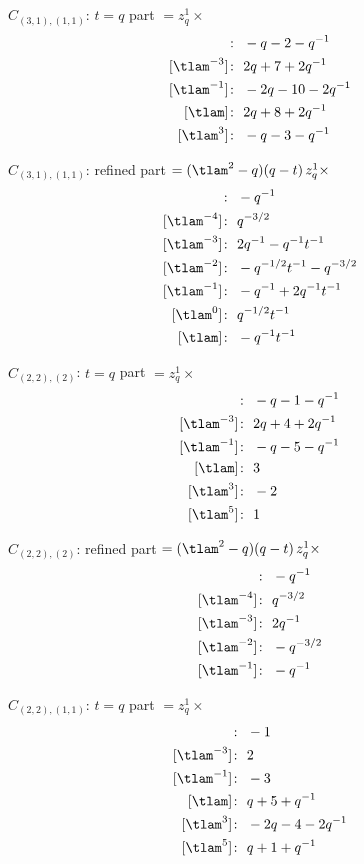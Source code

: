 $\hat C_{(3,1),(1,1)}$: $t = q$ part $= z_q^{1} \times$
\begin{align*}
[\tlam^{-5}]\colon\ & -q -2 -q^{-1} \\
[\tlam^{-3}]\colon\ & 2 q +7 +2 q^{-1} \\
[\tlam^{-1}]\colon\ & -2 q -10 -2 q^{-1} \\
[\tlam]\colon\ & 2 q +8 +2 q^{-1} \\
[\tlam^{3}]\colon\ & -q -3 -q^{-1}
\end{align*}

$\hat C_{(3,1),(1,1)}$: refined part $= (\tlam^2 - q)(q - t)\, z_q^{1} \times$
\begin{align*}
[\tlam^{-5}]\colon\ & -q^{-1} \\
[\tlam^{-4}]\colon\ & q^{-3/2} \\
[\tlam^{-3}]\colon\ & 2 q^{-1} -q^{-1} t^{-1} \\
[\tlam^{-2}]\colon\ & -q^{-1/2} t^{-1} -q^{-3/2} \\
[\tlam^{-1}]\colon\ & -q^{-1} +2 q^{-1} t^{-1} \\
[\tlam^{0}]\colon\ & q^{-1/2} t^{-1} \\
[\tlam]\colon\ & -q^{-1} t^{-1}
\end{align*}

$\hat C_{(2,2),(2)}$: $t = q$ part $= z_q^{1} \times$
\begin{align*}
[\tlam^{-5}]\colon\ & -q -1 -q^{-1} \\
[\tlam^{-3}]\colon\ & 2 q +4 +2 q^{-1} \\
[\tlam^{-1}]\colon\ & -q -5 -q^{-1} \\
[\tlam]\colon\ & 3 \\
[\tlam^{3}]\colon\ & -2 \\
[\tlam^{5}]\colon\ & 1
\end{align*}

$\hat C_{(2,2),(2)}$: refined part $= (\tlam^2 - q)(q - t)\, z_q^{1} \times$
\begin{align*}
[\tlam^{-5}]\colon\ & -q^{-1} \\
[\tlam^{-4}]\colon\ & q^{-3/2} \\
[\tlam^{-3}]\colon\ & 2 q^{-1} \\
[\tlam^{-2}]\colon\ & -q^{-3/2} \\
[\tlam^{-1}]\colon\ & -q^{-1}
\end{align*}

$\hat C_{(2,2),(1,1)}$: $t = q$ part $= z_q^{1} \times$
\begin{align*}
[\tlam^{-5}]\colon\ & -1 \\
[\tlam^{-3}]\colon\ & 2 \\
[\tlam^{-1}]\colon\ & -3 \\
[\tlam]\colon\ & q +5 +q^{-1} \\
[\tlam^{3}]\colon\ & -2 q -4 -2 q^{-1} \\
[\tlam^{5}]\colon\ & q +1 +q^{-1}
\end{align*}

